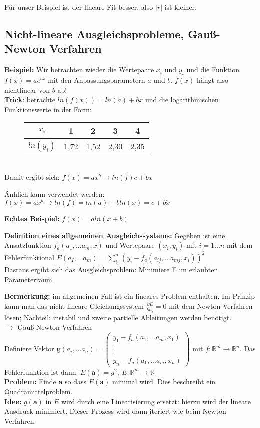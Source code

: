 \documentclass{scrartcl}
\begin{document}
Für unser Beispiel ist der lineare Fit besser, also $|r|$ ist kleiner.

\subsection{Nicht-lineare Ausgleichsprobleme, Gauß-Newton Verfahren}
\textbf{Beispiel:} Wir betrachten wieder die Wertepaare $x_i$ und $y_i$ und die Funktion $f(x)=a e^{bx}$ mit den Anpassungsparametern $a$ und $b$. $f(x)$ hängt also nichtlinear von $b$ ab! \\
\textbf{Trick}: betrachte $ln(f(x))=ln(a)+b x$ und die logarithmischen Funktionswerte in der Form: \begin{figure}[h]
\center

\begin{tabular}{|c||c|c|c|c|}

$x_i$ & 1 & 2 & 3 & 4 \\ 
\hline 
$ln(y_i)$ & 1,72 & 1,52 & 2,30 & 2,35\\ 

\end{tabular}
\end{figure}\\
Damit ergibt sich: $f(x)= a x^b \rightarrow ln(f) c+ b x$

Änhlich kann verwendet werden: $f(x) = a x^b \rightarrow ln(f) = ln(a) + b ln(x) = c + b \tilde{x}$

\textbf{Echtes Beispiel:} $f(x)=a ln(x+b)$

\textbf{Definition eines allgemeinen Ausgleichssystems:} Gegeben ist eine Ansatzfunktion $f_a(a_1,... a_m, x)$ und Wertepaare $(x_i,y_i)$ mit $i=1...n$ mit dem Fehlerfunktional $E(a_I,...a_m) = \sum_{i_1}^n (y_i -f_a(a_{ij},...a_{mj},x_i))^2$\\
Dasraus ergibt sich das Ausgleichsproblem: Minimiere E im erlaubten Parameterraum.

\textbf{Bermerkung:} im allgemeinen Fall ist ein lineares Problem enthalten. Im Prinzip kann man das nicht-lineare Gleichungssystem $\frac{\partial E}{\partial a_i}=0$ mit dem Newton-Verfahren lösen; Nachteil: instabil und zweite partielle Ableitungen werden benötigt.\\
$\rightarrow$ Gauß-Newton-Verfahren \\
Definiere Vektor $\boldsymbol{g}(a_i,... a_n) = \begin{pmatrix}
y_1-f_a(a_1,... a_m, x_1)\\
.\\
.\\
.\\
y_n-f_a(a_1,... a_m, x_n)
\end{pmatrix}$ mit $f: \mathbb{R}^m \rightarrow \mathbb{R}^n$.
Das Fehlerfunktion ist dann: $E(\boldsymbol{a})=g^2, \ E:\mathbb{R}^m \rightarrow \mathbb{R}$\\
\textbf{Problem:} Finde $\boldsymbol{a}$ so dass $E(\boldsymbol{a})$ minimal wird. Dies beschreibt ein Quadramittelproblem. \\
\textbf{Idee:} $g(\boldsymbol{a})$ in $E$ wird durch eine Linearisierung ersetzt:
hierzu wird der lineare Ausdruck minimiert.
Dieser Prozess wird dann iteriert wie beim Newton-Verfahren.
\end{document}

